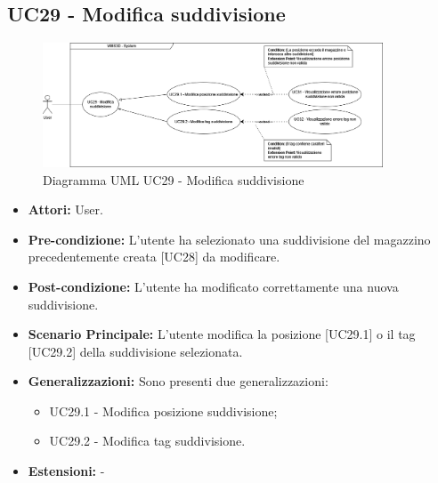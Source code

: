 \subsection{UC29 - Modifica suddivisione}
\begin{figure}[H]
  \centering
  \includegraphics[width=0.9\textwidth]{UC_diagrams_28-32/UC29_sys.drawio.png}
  \caption{Diagramma UML UC29 - Modifica suddivisione}
\end{figure}
\begin{itemize}
    \item \textbf{Attori:} User.
    \item \textbf{Pre-condizione:}  L'utente ha selezionato una suddivisione del magazzino precedentemente creata [UC28] da modificare.
    \item \textbf{Post-condizione:} L'utente ha modificato correttamente una nuova suddivisione.
    \item \textbf{Scenario Principale:} L'utente modifica la posizione [UC29.1] o il tag [UC29.2] della suddivisione selezionata.
    \item \textbf{Generalizzazioni:} Sono presenti due generalizzazioni:
    \begin{itemize}
        \item UC29.1 - Modifica posizione suddivisione;
        \item UC29.2 - Modifica tag suddivisione.
    \end{itemize}
    \item \textbf{Estensioni:} -
\end{itemize}

